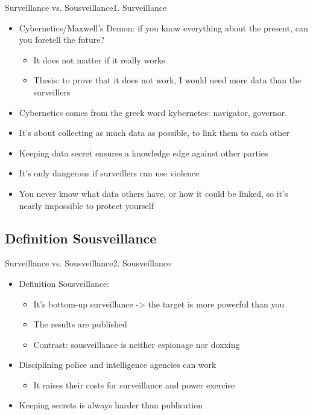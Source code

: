 \documentclass[10pt]{beamer}
\begin{document}
{\begin{frame}{Surveillance vs. Sousveillance}{1. Surveillance}
\begin{itemize}
  \item<1-> Cybernetics/Maxwell's Demon: if you know everything about the present, can you foretell the future?
  \begin{itemize}
    \item<2-> It does not matter if it really works
    \item<2-> Thesis: to prove that it does not work, I would need more data than the surveillers
  \end{itemize}
  \item<3-> Cybernetics comes from the greek word kybernetes: navigator, governor.
  \item<3-> It's about collecting as much data as possible, to link them to each other
  \item<3-> Keeping data secret ensures a knowledge edge against other parties
  \item<4-> It's only dangerous if surveillers can use violence
  \item<4-> You never know what data others have, or how it could be linked, so it's nearly impossible to protect yourself
\end{itemize}

\end{frame}

\subsection{Definition Sousveillance}
\begin{frame}{Surveillance vs. Sousveillance}{2. Sousveillance}

\begin{itemize}
  \item<1-> Definition Sousveillance:
  \begin{itemize}
    \item It's bottom-up surveillance -> the target is more powerful than you
    \item The results are published
    \item Contrast: sousveillance is neither espionage nor doxxing
  \end{itemize}
  \item<2-> Disciplining police and intelligence agencies can work
  \begin{itemize}
    \item<2-> It raises their costs for surveillance and power exercise
  \end{itemize}
  \item<2-> Keeping secrets is always harder than publication
\end{itemize}


\end{frame}}
\end{document}
